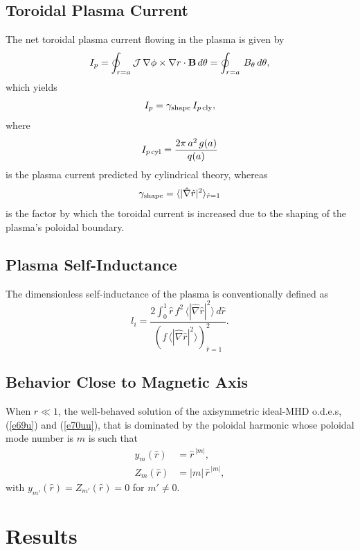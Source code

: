 \documentclass[12pt,prb,aps]{revtex4-1}
\begin{document}
\subsection{Toroidal Plasma Current}
The net toroidal plasma current flowing in the plasma is given by
\begin{equation}\label{ipdef}
I_p = \oint_{r=a}{\cal J}\,\nabla\phi\times\nabla r\cdot{\bf B}\,d\theta = \oint_{r=a}\,B_\theta\,d\theta,
\end{equation}
which yields
\begin{equation}
I_p =\gamma_{\rm shape}\, I_{p\,{\rm cly}},
\end{equation}
where
\begin{equation}
I_{p\,{\rm cyl}} = \frac{2\pi\,a^2\,g(a)}{q(a)}
\end{equation}
is the plasma current predicted by cylindrical theory, whereas
\begin{equation}
\gamma_{\rm shape} = \langle |\hat{\nabla}\hat{r}|^2\rangle_{\hat{r}=1}
\end{equation}
is the factor by which the toroidal  current is increased due to the shaping of the plasma's poloidal
boundary. 

\subsection{Plasma Self-Inductance}
The dimensionless self-inductance of the plasma is conventionally defined as\,\cite{tj}
\begin{equation}
l_i = \frac{2\int_0^1 \hat{r}\,f^2\,\langle |\hat{\nabla}\hat{r}|^2\rangle\,d\hat{r}}{(f\,\langle |\hat{\nabla}\hat{r}|^2\rangle)^2_{\hat{r}=1}}.
\end{equation}

\subsection{Behavior Close to Magnetic Axis}\label{axis}
When $\hat{r}\ll 1$, the well-behaved solution of the axisymmetric ideal-MHD o.d.e.s, (\ref{e69u}) and (\ref{e70uu}), that is dominated by the poloidal harmonic whose poloidal mode number is
$m$ is such that
\begin{align}\label{e234g}
y_m(\hat{r}) &= \hat{r}^{\,|m|},\\[0.5ex]
Z_m(\hat{r}) &= |m|\,\hat{r}^{\,|m|},\label{e235g}
\end{align}
with $y_{m'}(\hat{r})=Z_{m'}(\hat{r})=0$ for $m'\neq 0$. 

\section{Results}\label{results}
\end{document}
